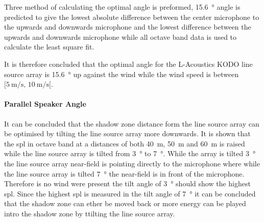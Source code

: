 Three method of calculating the optimal angle is preformed, \SI{15.6}{\degree} angle is predicted to give the lowest absolute difference between the center microphone to the upwards and downwards microphone and the lowest difference between the upwards and downwards microphone while all octave band data is used to calculate the least square fit.

It is therefore concluded that the optimal angle for the L-Acoustics KODO line source array is \SI{15.6}{\degree} up against the wind while the wind speed is between $[\SI{5}{\meter\per\second},\, \SI{10}{\meter\per\second}[ $.





\paragraph{Parallel Speaker Angle}
It can be concluded that the shadow zone distance form the line source array can be optimised by tilting the line source array more downwards. It is shown that the \gls{spl} in octave band at a distances of both \SI{40}{\meter}, \SI{50}{\meter} and \SI{60}{\meter} is raised while the line source array is tilted from \SI{3}{\degree} to \SI{7}{\degree}. While the array is tilted \SI{3}{\degree} the line source array near-field is pointing directly to the microphone where while the line source array is tilted \SI{7}{\degree} the near-field is in front of the microphone. Therefore is no wind were present the tilt angle of \SI{3}{\degree} should show the highest \gls{spl}. Since the highest \gls{spl} is measured in the tilt angle of \SI{7}{\degree} it can be concluded that the shadow zone can ether be moved back or more energy can be played intro the shadow zone by ttilting the line source array.





